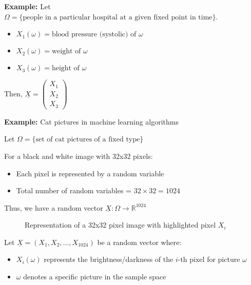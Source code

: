 \documentclass{article}
\begin{document}
    \textbf{Example:} Let $\Omega = \{\text{people in a particular hospital at a given fixed point in time}\}$.

    \begin{itemize}
        \item $X_1(\omega) = \text{blood pressure (systolic) of }\omega$
        \item $X_2(\omega) = \text{weight of }\omega$
        \item $X_3(\omega) = \text{height of }\omega$
    \end{itemize}

    Then, $\underline{X} = \begin{pmatrix} X_1 \\ X_2 \\ X_3 \end{pmatrix}$

    \textbf{Example:} Cat pictures in machine learning algorithms

    Let $\Omega = \{\text{set of cat pictures of a fixed type}\}$

    For a black and white image with 32x32 pixels:
    \begin{itemize}
        \item Each pixel is represented by a random variable
        \item Total number of random variables = $32 \times 32 = 1024$
    \end{itemize}

    Thus, we have a random vector $\underline{X} : \Omega \rightarrow \mathbb{R}^{1024}$

    \begin{figure}[h]
        \centering
        \caption{Representation of a 32x32 pixel image with highlighted pixel $X_i$}
    \end{figure}

    Let $\underline{X} = (X_1, X_2, \ldots, X_{1024})$ be a random vector where:

    \begin{itemize}
        \item $X_i(\omega)$ represents the brightness/darkness of the $i$-th pixel for picture $\omega$
        \item $\omega$ denotes a specific picture in the sample space
    \end{itemize}
\end{document}
